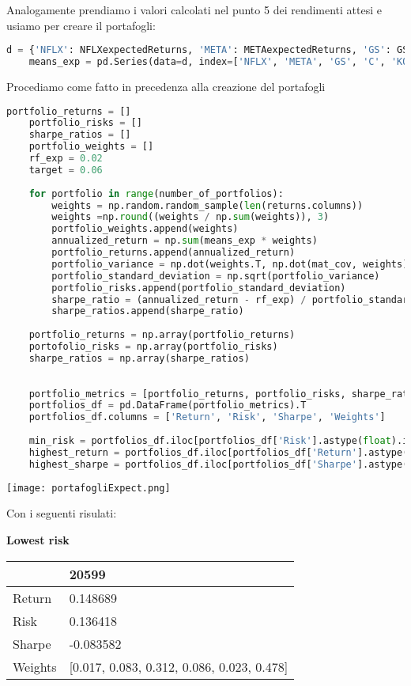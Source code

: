 \documentclass{report}
\begin{document}
Analogamente prendiamo i valori calcolati nel punto 5 dei rendimenti attesi e usiamo per creare il portafogli:
\begin{lstlisting}[language=python]
    d = {'NFLX': NFLXexpectedReturns, 'META': METAexpectedReturns, 'GS': GSexpectedReturns, 'C': CexpectedReturns, 'KO': KOexpectedReturns, 'PEP': PEPexpectedReturns}
    means_exp = pd.Series(data=d, index=['NFLX', 'META', 'GS', 'C', 'KO', 'PEP'])
\end{lstlisting}
Procediamo come fatto in precedenza alla creazione del portafogli
\begin{lstlisting}[language=python]
    portfolio_returns = []
    portfolio_risks = []
    sharpe_ratios = []
    portfolio_weights = []
    rf_exp = 0.02
    target = 0.06
    
    for portfolio in range(number_of_portfolios):
        weights = np.random.random_sample(len(returns.columns))
        weights =np.round((weights / np.sum(weights)), 3)
        portfolio_weights.append(weights)
        annualized_return = np.sum(means_exp * weights)
        portfolio_returns.append(annualized_return)
        portfolio_variance = np.dot(weights.T, np.dot(mat_cov, weights))
        portfolio_standard_deviation = np.sqrt(portfolio_variance)
        portfolio_risks.append(portfolio_standard_deviation)
        sharpe_ratio = (annualized_return - rf_exp) / portfolio_standard_deviation
        sharpe_ratios.append(sharpe_ratio)
    
    portfolio_returns = np.array(portfolio_returns)
    portofolio_risks = np.array(portfolio_risks)
    sharpe_ratios = np.array(sharpe_ratios)
    
    
    portfolio_metrics = [portfolio_returns, portfolio_risks, sharpe_ratios, portfolio_weights]
    portfolios_df = pd.DataFrame(portfolio_metrics).T
    portfolios_df.columns = ['Return', 'Risk', 'Sharpe', 'Weights']
    
    min_risk = portfolios_df.iloc[portfolios_df['Risk'].astype(float).idxmin()]
    highest_return = portfolios_df.iloc[portfolios_df['Return'].astype(float).idxmax()]
    highest_sharpe = portfolios_df.iloc[portfolios_df['Sharpe'].astype(float).idxmax()]
\end{lstlisting}

\texttt{[image: portafogliExpect.png]}

Con i seguenti risulati:

\textbf{Lowest risk}

\begin{tabular}{ll}
\toprule
{} &                                       20599 \\
\midrule
Return  &                                    0.148689 \\
Risk    &                                    0.136418 \\
Sharpe  &                                   -0.083582 \\
Weights &  [0.017, 0.083, 0.312, 0.086, 0.023, 0.478] \\
\bottomrule
\end{tabular}
\end{document}
